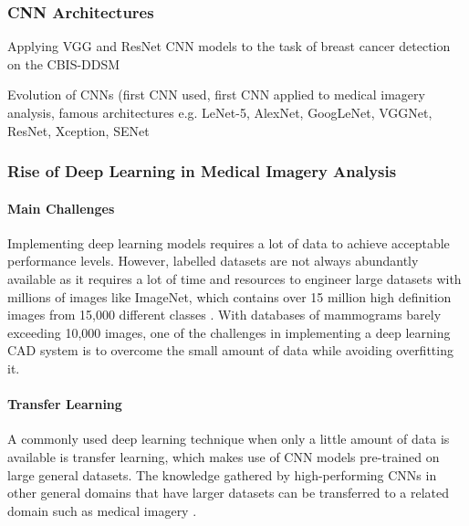 \subsubsection{CNN Architectures}

Applying VGG and ResNet CNN models to the task of breast cancer detection on the CBIS-DDSM

Evolution of CNNs (first CNN used, first CNN applied to medical imagery analysis, famous architectures e.g. LeNet-5, AlexNet, GoogLeNet, VGGNet, ResNet, Xception, SENet



\subsubsection{Rise of Deep Learning in Medical Imagery Analysis}

\paragraph{Main Challenges}

Implementing deep learning models requires a lot of data to achieve acceptable performance levels. However, labelled datasets are not always abundantly available as it requires a lot of time and resources to engineer large datasets with millions of images \citep{Krizhevsky2012} like ImageNet, which contains over 15 million high definition images from 15,000 different classes \citep{Deng2010}. With databases of mammograms barely exceeding 10,000 images, one of the challenges in implementing a deep learning CAD system is to overcome the small amount of data while avoiding overfitting it.

\paragraph{Transfer Learning}

A commonly used deep learning technique when only a little amount of data is available is transfer learning, which makes use of CNN models pre-trained on large general datasets. The knowledge gathered by high-performing CNNs in other general domains that have larger datasets can be transferred to a related domain such as medical imagery \citep{Falconi2019}.\\


